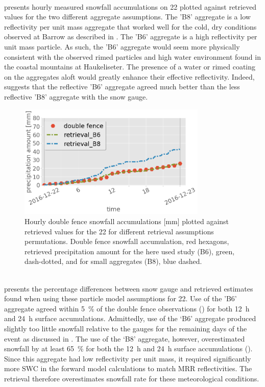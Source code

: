 \\
 presents hourly measured snowfall accumulations on \SI{22}{\dec} plotted against retrieved values for the two different aggregate assumptions. The 'B8' aggregate is a low reflectivity per unit mass aggregate that worked well for the cold, dry conditions observed at Barrow as described in \citet{cooper_variational_2017}.  The 'B6' aggregate is a high reflectivity per unit mass particle.  As such, the 'B6' aggregate would seem more physically consistent with the observed rimed particles and high water environment found in the coastal mountains at Haukeliseter.  The presence of a water or rimed coating on the aggregates aloft would greatly enhance their effective reflectivity. Indeed,  suggests that the reflective 'B6' aggregate agreed much better than the less reflective 'B8' aggregate with the snow gauge.
%
\\
\begin{figure}[t]
	\centering
	\includegraphics[width=0.8\textwidth]{./fig_obs_ret/20161222_2}
	\caption{Hourly double fence snowfall accumulations [mm] plotted against retrieved values for the \SI{22}{\dec} for different retrieval assumptions permutations. Double fence snowfall accumulation, red hexagons, retrieved precipitation amount for the here used study (B6), green, dash-dotted, and for small aggregates (B8), blue dashed.}\label{fig:ret_sensitivity}
\end{figure}
\\
 presents the percentage differences between snow gauge and retrieved estimates found when using these particle model assumptions for \SI{22}{\dec}. Use of the 'B6' aggregate agreed within \SI{5}{\percent} of the double fence observations () for both \SI{12}{\hour} and \SI{24}{\hour} surface accumulations. Admittedly, use of the ‘B6’ aggregate produced slightly too little snowfall relative to the gauges for the remaining days of the event as discussed in . The use of the ‘B8’ aggregate, however, overestimated snowfall by at least \SI{65}{\percent} for both the \SI{12}{\hour} and \SI{24}{\hour} surface accumulations (). Since this aggregate had low reflectivity per unit mass, it required significantly more SWC in the forward model calculations to match MRR reflectivities. The retrieval therefore overestimates snowfall rate for these meteorological conditions.
